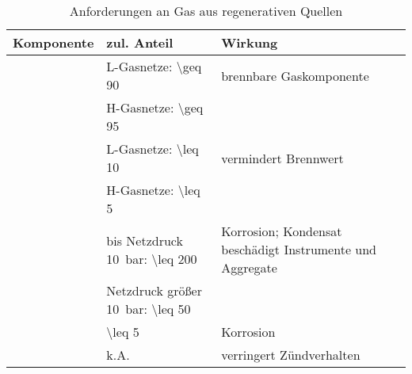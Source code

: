 {
\renewcommand{\arraystretch}{1.1}
\begin{table}[H]
	\begin{center}
		\caption{Anforderungen an Gas aus regenerativen Quellen \parencite{FNR14}\parencite{KoBi16}}
		\begin{tabu} to 0.5\textwidth {| X[0.6] | X | X[1.2] |}
\hline
			Komponente  &	zul. Anteil  & Wirkung					\\		
\hline
			 &	L-Gasnetze: \SI{\geq 90}{\Molpercent}  &	brennbare Gaskomponente	\\
					 &	H-Gasnetze: \SI{\geq 95}{\Molpercent}	&	{}							\\ 
\hline

			  	&	L-Gasnetze: \SI{\leq 10}{\Molpercent}  &	vermindert Brennwert	\\
						&	H-Gasnetze: \SI{\leq 5}{\Molpercent}	 &	{}						\\ 

\hline
			     	&	bis Netzdruck \SI{10}{\bar}: \SI{\leq 200}{\mgcubm}	&	Korrosion; Kondensat beschädigt Instrumente und Aggregate	\\
						&	Netzdruck größer \SI{10}{\bar}: \SI{\leq 50}{\mgcubm}	& {}	\\ 
\hline
			  	&	\SI{\leq 5}{\mgcubm}  	&	Korrosion			\\
\hline
			  	&	k.A.  	&	verringert Zündverhalten			\\
\hline
			
		\end{tabu}
		\label{tab:tab_gasgrid_spec}
	\end{center}
\end{table}
}